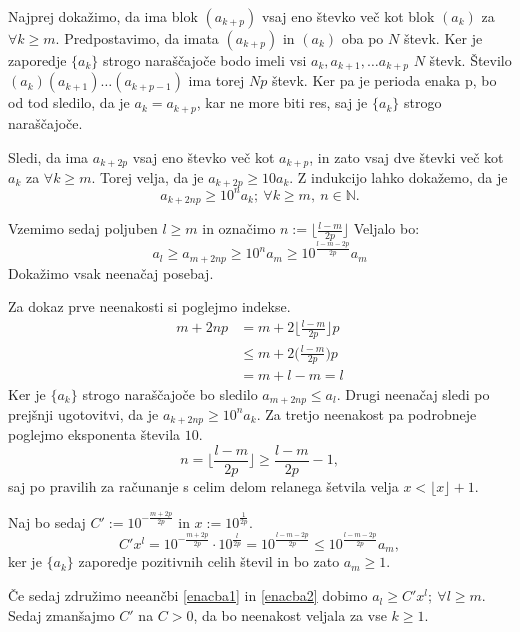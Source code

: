\documentclass[a4paper,12pt]{article}
\def\N{\mathbb{N}} %
\begin{document}
Najprej dokažimo, da ima blok $(a_{k+p})$ vsaj eno števko več kot blok $(a_k)$ za $\forall k \geq m$.
Predpostavimo, da imata $(a_{k+p})$ in $(a_k)$ oba po $N$ števk. 
Ker je zaporedje $\{a_k\}$ strogo naraščajoče bodo imeli vsi $a_k, a_{k+1}, \dots a_{k+p}$ $N$ števk.
Število $(a_k)(a_{k+1})\dots (a_{k+p-1})$ ima torej $Np$ števk. Ker pa je perioda enaka p,
bo od tod sledilo, da je $a_k = a_{k+p}$, kar ne more biti res, saj je $\{a_k\}$ strogo naraščajoče.

Sledi, da ima $a_{k+ 2p}$ vsaj eno števko več kot $a_{k+p}$, in zato vsaj dve števki več kot $a_k$
za $\forall k \geq m$.
Torej velja, da je $a_{k+2p} \geq 10 a_k$. Z indukcijo lahko dokažemo, da je 
\[ a_{k+2np} \geq 10^n a_k; \ \forall k \geq m, \ n \in \N.\]

Vzemimo sedaj poljuben $l \geq m$ in označimo $n := \lfloor \frac{l-m}{2p} \rfloor$
Veljalo bo:
\begin{equation}\label{enacba1}
    a_l \geq a_{m+2np} \geq 10^n a_m \geq 10 ^{\frac{l-m-2p}{2p}}a_m
\end{equation}
Dokažimo vsak neenačaj posebaj.

Za dokaz prve neenakosti si poglejmo indekse. 
\[
    \begin{split}
    m + 2np &= m + 2 \bigg\lfloor \frac{l-m}{2p}\bigg\rfloor p \\
    &\leq m + 2\bigg(\frac{l-m}{2p}\bigg)p \\
    &= m + l - m = l
    \end{split}
    \] 
Ker je $\{a_k\}$ strogo naraščajoče bo sledilo $a_{m+2np} \leq a_l$.
Drugi neenačaj sledi po prejšnji ugotovitvi, da je $a_{k+2np} \geq 10^n a_k$.
Za tretjo neenakost pa podrobneje poglejmo eksponenta števila $10$. 
\[
    n = \bigg\lfloor \frac{l-m}{2p}\bigg\rfloor \geq \frac{l-m}{2p} - 1,
     \]
saj po pravilih za računanje s celim delom relanega šetvila velja $x < \lfloor x\rfloor + 1$.

Naj bo sedaj $C' := 10^{-\frac{m + 2p}{2p}}$ in $x := 10^{\frac{1}{2p}}$.
\begin{equation}\label{enacba2}
     C'x^l = 10^{-\frac{m + 2p}{2p}} \cdot 10^{\frac{l}{2p}} = 10 ^{\frac{l-m-2p}{2p}}
     \leq 10 ^{\frac{l-m-2p}{2p}} a_m,
\end{equation}
ker je $\{a_k\}$ zaporedje pozitivnih celih števil in bo zato $a_m \geq 1$.

Če sedaj združimo neeančbi \ref{enacba1} in \ref{enacba2} dobimo 
$a_l \geq C'x^l; \ \forall l \geq m$. Sedaj zmanšajmo $C'$ na $C>0$, da bo neenakost veljala
za vse $k \geq 1$.
\end{document}

